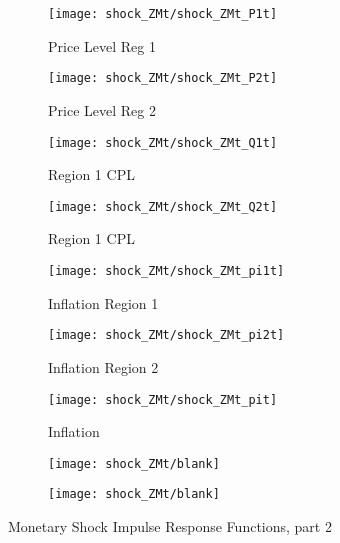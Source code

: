 \documentclass[../thesis.tex]{subfiles}
\begin{document}
\begin{figure}[h!]
	\begin{subfigure}[b]{0.3\textwidth}
		\centering
		\texttt{[image: shock\_ZMt/shock\_ZMt\_P1t]}
		\caption{\footnotesize Price Level Reg 1}
		\label{fig:ZMt-P1t}
	\end{subfigure}
	\hfill
	\begin{subfigure}[b]{0.3\textwidth}
		\centering
		\texttt{[image: shock\_ZMt/shock\_ZMt\_P2t]}
		\caption{\footnotesize Price Level Reg 2}
		\label{fig:ZMt-P2t}
	\end{subfigure}
	\hfill
	\begin{subfigure}[b]{0.3\textwidth}
		\centering
		\texttt{[image: shock\_ZMt/shock\_ZMt\_Q1t]}
		\caption{\footnotesize Region 1 CPL}
		\label{fig:ZMt-Q1t}
	\end{subfigure}
	\hfill		
	\vspace*{0.5cm}
	
	
	\begin{subfigure}[b]{0.3\textwidth}
		\centering
		\texttt{[image: shock\_ZMt/shock\_ZMt\_Q2t]}
		\caption{\footnotesize Region 1 CPL}
		\label{fig:ZMt-Q2t}
	\end{subfigure}
	\hfill
	\begin{subfigure}[b]{0.3\textwidth}
		\centering
		\texttt{[image: shock\_ZMt/shock\_ZMt\_pi1t]}
		\caption{\footnotesize Inflation Region 1}
		\label{fig:ZMt-pi1t}
	\end{subfigure}
	\hfill
	\begin{subfigure}[b]{0.3\textwidth}
		\centering
		\texttt{[image: shock\_ZMt/shock\_ZMt\_pi2t]}
		\caption{\footnotesize Inflation Region 2}
		\label{fig:ZMt-pi2t}
	\end{subfigure}
	\hfill
	\vspace*{0.5cm}
	
	
	\begin{subfigure}[b]{0.3\textwidth}
		\centering
		\texttt{[image: shock\_ZMt/shock\_ZMt\_pit]}
		\caption{\footnotesize Inflation}
		\label{fig:ZMt-pit}
	\end{subfigure}
	\hfill
	\begin{subfigure}[b]{0.3\textwidth}
		\centering
		\texttt{[image: shock\_ZMt/blank]}
	\end{subfigure}
	\hfill
	\begin{subfigure}[b]{0.3\textwidth}
		\centering
		\texttt{[image: shock\_ZMt/blank]}
	\end{subfigure}
	\hfill
	\vspace*{0.5cm}		
	\caption{Monetary Shock Impulse Response Functions, part 2}
	\label{fig:ZMt-irf2}
\end{figure}
\end{document}
